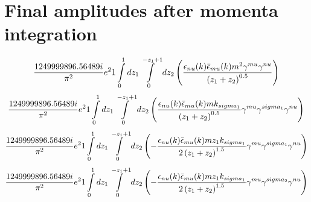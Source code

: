 \section*{Final amplitudes after momenta integration}
\begin{dmath}\frac{1249999896.56489 i}{\pi^{2}} e^{2}1\int\limits_{ 0 }^{ 1 } d{ z_{ 1 } }\int\limits_{ 0 }^{ - { z_{ 1 } } + 1 } d{ z_{ 2 } }\left(\frac{\epsilon_{ \\nu }({ k }) \bar{\epsilon}_{ \\mu }({ k }) m^{2} { \gamma^{ \\mu } } { \gamma^{ \\nu } }}{\left({ z_{ 1 } } + { z_{ 2 } }\right)^{0.5}}\right)\end{dmath}
\begin{dmath}\frac{1249999896.56489 i}{\pi^{2}} e^{2}1\int\limits_{ 0 }^{ 1 } d{ z_{ 1 } }\int\limits_{ 0 }^{ - { z_{ 1 } } + 1 } d{ z_{ 2 } }\left(\frac{\epsilon_{ \\nu }({ k }) \bar{\epsilon}_{ \\mu }({ k }) m { { k }_{ \\sigma_1 } }}{\left({ z_{ 1 } } + { z_{ 2 } }\right)^{0.5}} { \gamma^{ \\mu } } { \gamma^{ \\sigma_1 } } { \gamma^{ \\nu } }\right)\end{dmath}
\begin{dmath}\frac{1249999896.56489 i}{\pi^{2}} e^{2}1\int\limits_{ 0 }^{ 1 } d{ z_{ 1 } }\int\limits_{ 0 }^{ - { z_{ 1 } } + 1 } d{ z_{ 2 } }\left(- \frac{\epsilon_{ \\nu }({ k }) \bar{\epsilon}_{ \\mu }({ k }) m { z_{ 1 } } { { k }_{ \\sigma_1 } }}{2 \left({ z_{ 1 } } + { z_{ 2 } }\right)^{1.5}} { \gamma^{ \\mu } } { \gamma^{ \\sigma_1 } } { \gamma^{ \\nu } }\right)\end{dmath}
\begin{dmath}\frac{1249999896.56489 i}{\pi^{2}} e^{2}1\int\limits_{ 0 }^{ 1 } d{ z_{ 1 } }\int\limits_{ 0 }^{ - { z_{ 1 } } + 1 } d{ z_{ 2 } }\left(- \frac{\epsilon_{ \\nu }({ k }) \bar{\epsilon}_{ \\mu }({ k }) m { z_{ 1 } } { { k }_{ \\sigma_1 } }}{2 \left({ z_{ 1 } } + { z_{ 2 } }\right)^{1.5}} { \gamma^{ \\mu } } { \gamma^{ \\sigma_2 } } { \gamma^{ \\nu } }\right)\end{dmath}
